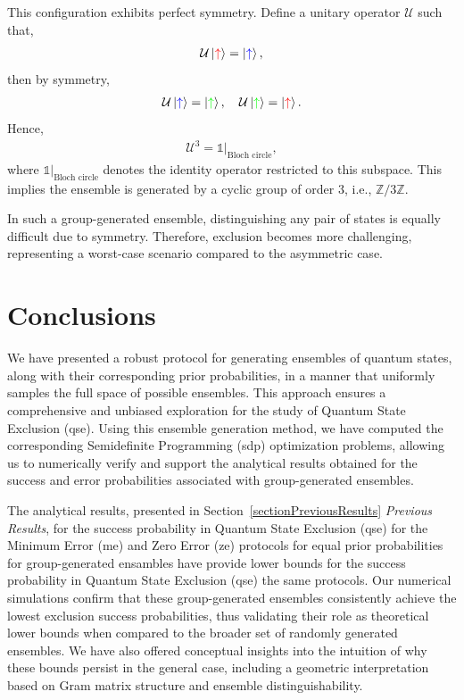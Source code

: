 \documentclass[12pt,letterpaper]{article}
\begin{document}
This configuration exhibits perfect symmetry. Define a unitary operator $\mathcal{U}$ such that,
\begin{align*}
\mathcal{U} \ket{\textcolor{red}{\uparrow}} = \ket{\textcolor{blue}{\uparrow}},
\end{align*}
then by symmetry,
\begin{align*}
\mathcal{U} \ket{\textcolor{blue}{\uparrow}} = \ket{\textcolor{green}{\uparrow}}, \quad \mathcal{U} \ket{\textcolor{green}{\uparrow}} = \ket{\textcolor{red}{\uparrow}}.
\end{align*}
Hence,
\begin{align*}
\mathcal{U}^3 = \mathds{1}|_{\text{Bloch circle}},
\end{align*}
where $\mathds{1}|_{\text{Bloch circle}}$ denotes the identity operator restricted to this subspace. This implies the ensemble is generated by a cyclic group of order 3, i.e., $\mathbb{Z}/3\mathbb{Z}$.

In such a group-generated ensemble, distinguishing any pair of states is equally difficult due to symmetry. Therefore, exclusion becomes more challenging, representing a worst-case scenario compared to the asymmetric case.

\newpage
\section{Conclusions}

\hspace{20pt}We have presented a robust protocol for generating ensembles of quantum states, along with their corresponding prior probabilities, in a manner that uniformly samples the full space of possible ensembles. This approach ensures a comprehensive and unbiased exploration for the study of Quantum State Exclusion (\gls{qse}). Using this ensemble generation method, we have computed the corresponding Semidefinite Programming (\gls{sdp}) optimization problems, allowing us to numerically verify and support the analytical results obtained for the success and error probabilities associated with group-generated ensembles.

The analytical results, presented in Section~\ref{sectionPreviousResults} \emph{Previous Results}, for the success probability in Quantum State Exclusion (\gls{qse}) for the Minimum Error (\gls{me}) and Zero Error (\gls{ze}) protocols for equal prior probabilities for group-generated ensambles have provide lower bounds for the success probability in Quantum State Exclusion (\gls{qse}) the same protocols. Our numerical simulations confirm that these group-generated ensembles consistently achieve the lowest exclusion success probabilities, thus validating their role as theoretical lower bounds when compared to the broader set of randomly generated ensembles. We have also offered conceptual insights into the intuition of why these bounds persist in the general case, including a geometric interpretation based on Gram matrix structure and ensemble distinguishability.
\end{document}
